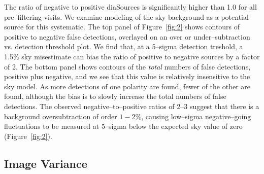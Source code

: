 \documentclass[iop]{emulateapj}
\begin{document}
The ratio of negative to positive diaSources is significantly higher than 1.0 for all pre--filtering visits.
We examine modeling of the sky background as a potential source for this systematic.
The top panel of Figure~\ref{fig:2} shows contours of positive to negative false detections, overlayed on an over or under--subtraction vs. detection threshold plot.
We find that, at a 5--sigma detection treshold, a 1.5\% sky misestimate can bias the ratio of positive to negative sources by a factor of 2.
The bottom panel shows contours of the {\it total} numbers of false detections, positive plus negative, and we see that this value is relatively insensitive to the sky model.
As more detections of one polarity are found, fewer of the other are found, although the bias is to slowly increase the total numbers of false detections.
The observed negative--to--positive ratios of 2--3 suggest that there is a background oversubtraction of order $1-2\%$, causing low--sigma negative--going fluctuations to be measured at 5--sigma below the expected sky value of zero (Figure~\ref{fig:2}).
\begin{figure*}[!ht]
\centering
{}
\caption{
Misestimation of the sky background value has an effect on both the number of false detections, and relative abundance of positive to negative false detections.
The top pane of this figure shows the relative number of +ve/-ve (-ve/+ve) detections if the sky background is under (over) subtracted at a particular fractional level.
The  bottom panel shows how the total number of false detections changes for the same misestimation.
This is not a strong function of the seeing; these numbers are appropriate for the 0.6'' simulation presented here.
}
\label{fig:2}
\end{figure*}

\subsection{Image Variance \label{sec-varmis}}
\end{document}
